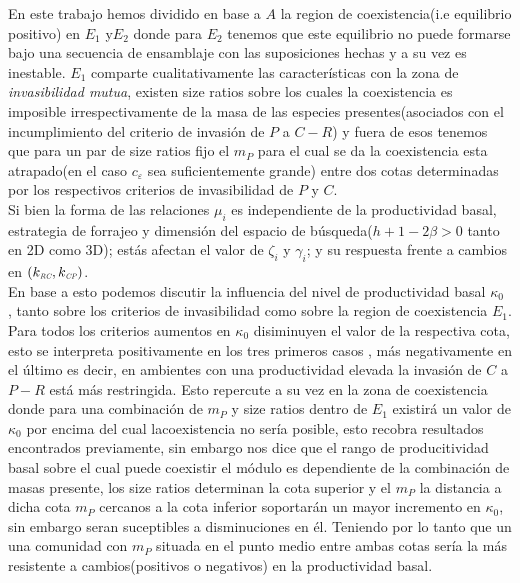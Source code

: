 En este trabajo hemos dividido en base a $A$ la region de coexistencia(i.e equilibrio positivo) en $E_1$ y$E_2$ donde para $E_2$ tenemos que este equilibrio no puede formarse bajo una secuencia de ensamblaje con las suposiciones hechas y a su vez es inestable. $E_1$ comparte cualitativamente las caracter\'isticas con la zona de \emph{invasibilidad mutua}, existen size ratios sobre los cuales la coexistencia es imposible irrespectivamente de la masa de las especies presentes(asociados con el incumplimiento del criterio de invasi\'on de $P$ a $C-R$) y fuera de esos tenemos que para un par de size ratios fijo el $m_P$ para el cual se da la coexistencia esta atrapado(en el caso $c_\varepsilon$ sea suficientemente grande) entre dos cotas determinadas por los respectivos criterios de invasibilidad de $P$ y $C$. \\
Si bien la forma de las relaciones $\mu_i$ es independiente de la productividad basal, estrategia de forrajeo y dimensi\'on del espacio de b\'usqueda($h +1 - 2\beta >0$ tanto en 2D como 3D); est\'as afectan el valor de $\zeta_i$ y $\gamma_i$; y su respuesta frente a cambios en $(k_{\textit{\tiny RC}},k_{\textit{\tiny CP}})$.\\
En base a esto podemos discutir la influencia del nivel de productividad basal $\kappa_0$ , tanto sobre los criterios de invasibilidad como sobre la region de coexistencia $E_1$. Para todos los criterios aumentos en $\kappa_0$ disiminuyen el valor de la respectiva cota, esto se interpreta positivamente en los tres primeros casos , m\'as negativamente en el \'ultimo es decir, en ambientes con una productividad elevada la invasi\'on de $C$ a $P-R$ est\'a m\'as restringida. Esto repercute a su vez en la zona de coexistencia donde para una combinaci\'on de $m_P$ y size ratios dentro de $E_1$ existir\'a un valor de $\kappa_0$ por encima del cual lacoexistencia no ser\'ia posible, esto recobra resultados encontrados previamente\citep{holt1997theoretical}, sin embargo nos dice que el rango de producitividad basal sobre el cual puede coexistir el m\'odulo es dependiente de la combinaci\'on de masas presente, los size ratios determinan la cota superior y el $m_P$ la distancia a dicha cota $m_P$ cercanos a la cota inferior soportar\'an un mayor incremento en $\kappa_0$, sin embargo seran suceptibles a disminuciones en \'el. Teniendo por lo tanto que un una comunidad con $m_P$ situada en el punto medio entre ambas cotas ser\'ia la m\'as resistente a cambios(positivos o negativos) en la productividad basal.\\

